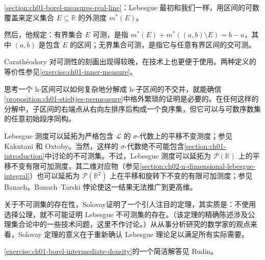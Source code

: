 \documentclass[../../main.tex]{subfiles}%
\begin{document}
\cref{section:ch01-borel-measures-real-line}：Lebesgue 最初和我们一样，用区间的可数覆盖来定义集合 $E\subseteq\mathbb{R}$ 的外测度 $m^*(E)$。
\begin{definition*}
然后，他规定：有界集合 $E$ 可测，是指 $m^*(E)+m^*((a,b)\setminus E)=b-a$，其中 $(a,b)$ 是包含 $E$ 的区间；无界集合可测，是指它与任意有界区间的交可测。
\end{definition*}
Carathéodory 对可测性的刻画出现得较晚，在技术上也更便于使用。两种定义的等价性参见\cref{exercise:ch01-inner-measure}。

思考一个 h-区间可以如何复杂地分解成 h-子区间的不交并，就能确信\cref{proposition:ch01-stieltjes-premeasure}中格外繁琐的证明是必要的。在任何这样的分解中，子区间的右端点从右向左排序后构成一个良序集，但它可以与可数序数集的任意初始段序同构。

Lebesgue 测度可以延拓为严格包含 $\mathscr{L}$ 的 $\sigma$-代数上的平移不变测度；参见 Kakutani 和 Oxtoby\cite{folland-bib-081}。当然，这样的 $\sigma$-代数绝不可能包含\cref{section:ch01-introduction}中讨论的不可测集。不过，Lebesgue 测度可以延拓为 $\mathscr{P}(\mathbb{R})$ 上的平移不变有限可加测度，其二维对应物（参见\cref{section:ch02-n-dimensional-lebesgue-integral}）也可以延拓为 $\mathscr{P}(\mathbb{R}^2)$ 上在平移和旋转下不变的有限可加测度；参见 Banach\cite{folland-bib-008}。Banach–Tarski 悖论使这一结果无法推广到更高维。

关于不可测集的存在性，Solovay\cite{folland-bib-138}证明了一个引人注目的定理，其实质是：不使用选择公理，就不可能证明 Lebesgue 不可测集的存在。（该定理的精确陈述涉及公理集合论中的一些技术问题，这里不作讨论。）从从事分析研究的数学家的观点来看，Solovay 定理的意义在于重新确认 Lebesgue 理论足以满足所有实际需要。

\cref{exercise:ch01-borel-intermediate-density}的一个简洁解答见 Rudin\cite{folland-bib-124}。
\end{document}
